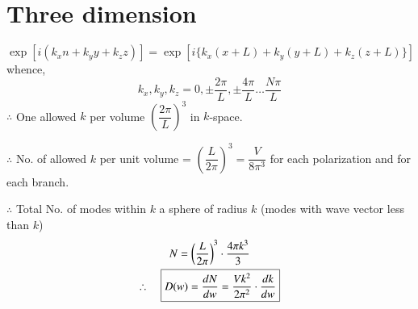 \section*{Three dimension}
$$
\exp [i(k_{x}n+k_{y}y+k_{z}z)]=\exp [i\{k_{x}(x+L)+k_{y}(y+L)+k_{z}(z+L)\}]
$$
whence,
$$
k_{x},k_{y},k_{z}=0, \pm \dfrac{2\pi}{L}, \pm \dfrac{4\pi}{L}\ldots \dfrac{N\pi}{L}
$$
$\therefore$ One allowed $k$ per volume $\left(\dfrac{2\pi}{L}\right)^{3}$ in $k$-space.

$\therefore$ No. of allowed $k$ per unit volume = $\left(\dfrac{L}{2\pi}\right)^{3}=\dfrac{V}{8\pi^{3}}$ for each polarization and for each branch.

$\therefore$ Total No. of modes within $k$ a sphere of radius $k$ (modes with wave vector less than $k$)
\begin{gather*}
N=\left(\dfrac{L}{2\pi}\right)^{3}\cdot \dfrac{4\pi k^{3}}{3}\\
\therefore\quad \fbox{$D(w)=\dfrac{dN}{dw}=\dfrac{Vk^{2}}{2\pi^{2}}\cdot \dfrac{dk}{dw}$}
\end{gather*}

